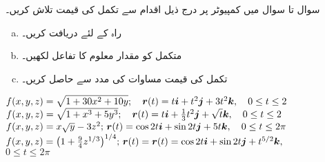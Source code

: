 سوال  تا سوال  میں کمپیوٹر پر درج ذیل اقدام سے تکمل کی قیمت تلاش کریں۔
\begin{enumerate}[a.]
\item
راہ  کے لئے  دریافت کریں۔
\item
متکمل  کو مقدار معلوم  کا تفاعل لکھیں۔
\item
تکمل  کی قیمت مساوات  کی مدد سے حاصل  کریں۔ 
\end{enumerate}
%
\(f(x,y,z)=\sqrt{1+30x^2+10y};\quad {\ensuremath{{\boldsymbol{r}}}}(t)=t{\boldsymbol{i}}+t^2{\boldsymbol{j}}+3t^2{\boldsymbol{k}},\quad 0\le t\le 2\)
%
\(f(x,y,z)=\sqrt{1+x^3+5y^3};\quad {\ensuremath{{\boldsymbol{r}}}}(t)=t{\boldsymbol{i}}+\frac{1}{3}t^2{\boldsymbol{j}}+\sqrt{t}{\boldsymbol{k}},\quad 0\le t\le 2\)
%
\(f(x,y,z)=x\sqrt{y}-3z^2;\,{{\boldsymbol{r}}}(t)=\cos 2t {\boldsymbol{i}}+\sin 2t{\boldsymbol{j}}+5t{\boldsymbol{k}},\quad 0\le t\le 2\pi\)
%
\(f(x,y,z)=\big(1+\frac{9}{4}z^{1/3}\big)^{1/4};\, {{\boldsymbol{r}}}(t)={{\boldsymbol{r}}}(t)=\cos 2t {\boldsymbol{i}}+\sin 2t{\boldsymbol{j}}+t^{5/2}{\boldsymbol{k}},\)\\
\( 0\le t\le 2\pi\quad\quad\quad\quad\quad\quad\)
